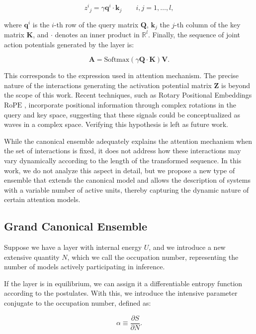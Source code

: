\documentclass[12pt]{article}
\begin{document}
\begin{equation}
z^i{}_j = \gamma \mathbf{q}^i \cdot \mathbf{k}_j \qquad i,j = 1,\dots,l,
\end{equation}

where $\mathbf{q}^i$ is the $i$-th row of the query matrix $\mathbf{Q}$, $\mathbf{k}_j$ the $j$-th column of the key matrix $\mathbf{K}$, and $\cdot$ denotes an inner product in $\mathbb{R}^l$. Finally, the sequence of joint action potentials generated by the layer is:

\begin{equation}
\mathbf{A} = \text{Softmax}(\gamma \mathbf{Q} \cdot \mathbf{K}) \mathbf{V}.
\end{equation}

This corresponds to the expression used in attention mechanism. The precise nature of the interactions generating the activation potential matrix $\mathbf{Z}$ is beyond the scope of this work. Recent techniques, such as Rotary Positional Embeddings $\text{RoPE}$ \cite{su2021roformer}, incorporate positional information through complex rotations in the query and key space, suggesting that these signals could be conceptualized as waves in a complex space. Verifying this hypothesis is left as future work.

While the canonical ensemble adequately explains the attention mechanism when the set of interactions is fixed, it does not address how these interactions may vary dynamically according to the length of the transformed sequence. In this work, we do not analyze this aspect in detail, but we propose a new type of ensemble that extends the canonical model and allows the description of systems with a variable number of active units, thereby capturing the dynamic nature of certain attention models.
\subsection*{Grand Canonical Ensemble}

Suppose we have a layer with internal energy $U$, and we introduce a new extensive quantity $N$, which we call the occupation number, representing the number of models actively participating in inference.

If the layer is in equilibrium, we can assign it a differentiable entropy function according to the postulates. With this, we introduce the intensive parameter conjugate to the occupation number, defined as:

\begin{equation}
\alpha \equiv \frac{\partial S}{\partial N}.
\end{equation}
\end{document}
